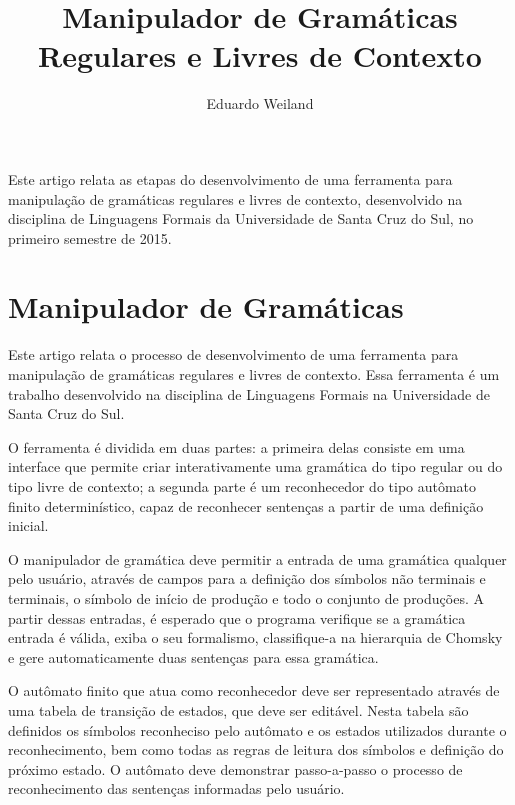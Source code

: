 \documentclass[12pt]{article}
\title{Manipulador de Gramáticas Regulares e Livres de Contexto}
\author{Eduardo Weiland\inst{1}}
\begin{document}
\maketitle

\begin{resumo}
  Este artigo relata as etapas do desenvolvimento de uma ferramenta para manipulação de gramáticas regulares e livres
  de contexto, desenvolvido na disciplina de Linguagens Formais da Universidade de Santa Cruz do Sul, no primeiro
  semestre de 2015.
\end{resumo}


\section{Manipulador de Gramáticas}

Este artigo relata o processo de desenvolvimento de uma ferramenta para manipulação de gramáticas regulares e livres de
contexto. Essa ferramenta é um trabalho desenvolvido na disciplina de Linguagens Formais na Universidade de Santa Cruz
do Sul.

O ferramenta é dividida em duas partes: a primeira delas consiste em uma interface que permite criar interativamente
uma gramática do tipo regular ou do tipo livre de contexto; a segunda parte é um reconhecedor do tipo autômato finito
determinístico, capaz de reconhecer sentenças a partir de uma definição inicial.

O manipulador de gramática deve permitir a entrada de uma gramática qualquer pelo usuário, através de campos para a
definição dos símbolos não terminais e terminais, o símbolo de início de produção e todo o conjunto de produções. A
partir dessas entradas, é esperado que o programa verifique se a gramática entrada é válida, exiba o seu formalismo,
classifique-a na hierarquia de Chomsky e gere automaticamente duas sentenças para essa gramática.

O autômato finito que atua como reconhecedor deve ser representado através de uma tabela de transição de estados, que
deve ser editável. Nesta tabela são definidos os símbolos reconheciso pelo autômato e os estados utilizados durante o
reconhecimento, bem como todas as regras de leitura dos símbolos e definição do próximo estado. O autômato deve
demonstrar passo-a-passo o processo de reconhecimento das sentenças informadas pelo usuário.
\end{document}
